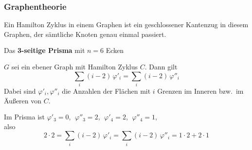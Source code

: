 \subsubsection*{Graphentheorie}

\begin{definition}
Ein Hamilton Zyklus in einem Graphen ist ein geschlossener Kantenzug in diesem Graphen, der sämtliche Knoten genau einmal passiert.
\end{definition}

\begin{beispiel}
Das \textbf{3-seitige Prisma} mit $n = 6$ Ecken
\end{beispiel}

\begin{satz}
$G$ sei ein ebener Graph mit Hamilton Zyklus $C$. Dann gilt
\[ \sum_i (i - 2)\,\varphi'_i = \sum_i (i - 2)\,\varphi''_i \]
Dabei sind $\varphi'_i, \varphi''_i$ die Anzahlen der Flächen mit $i$ Grenzen im Inneren bzw.\ im Äußeren von $C$.
\end{satz}

\begin{beispiel}
Im Prisma ist $\varphi'_3 = 0$, $\;\varphi''_3 = 2$, $\;\varphi'_4 = 2$, $\;\varphi''_4 = 1$,\\
also
\[ 2 \cdot 2 = \sum_i (i - 2)\,\varphi'_i = \sum_i (i - 2)\,\varphi''_i = 1 \cdot 2 + 2 \cdot 1 \]
\end{beispiel}

